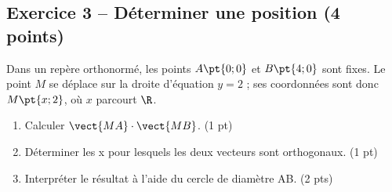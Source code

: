 \subsection*{Exercice 3 -- Déterminer une position (4 points)}
Dans un repère orthonormé, les points $A\pt{0;0}$ et $B\pt{4;0}$ sont fixes. Le point $M$ se déplace sur la droite d’équation $y=2$ ; ses coordonnées sont donc $M\pt{x;2}$, où $x$ parcourt $\R$.
\begin{enumerate}
\item Calculer $\vect{MA}\cdot\vect{MB}$. \hfill(1 pt)
\item Déterminer les x pour lesquels les deux vecteurs sont orthogonaux. \hfill(1 pt)
\item Interpréter le résultat à l’aide du cercle de diamètre AB. \hfill(2 pts)
\end{enumerate}
